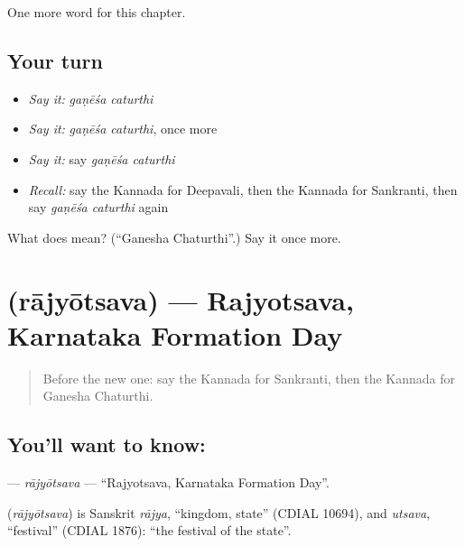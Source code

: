 \begin{grammarlens}[title={What you've built}]
One more word for this chapter.
\end{grammarlens}

\subsection*{Your turn}
\begin{itemize}
\raggedright
  \item \emph{Say it:} \emph{gaṇēśa caturthi}
  \item \emph{Say it:} \emph{gaṇēśa caturthi}, once more
  \item \emph{Say it:} say \emph{gaṇēśa caturthi}
  \item \emph{Recall:} say the Kannada for Deepavali, then the Kannada for Sankranti, then say \emph{gaṇēśa caturthi} again
\end{itemize}

\begin{tcolorbox}[breakable,colback=teal!4,colframe=teal!35!black,title={Before you move on}]
What does   mean? (\textquotedblleft{}Ganesha Chaturthi\textquotedblright{}.) Say it once more.
\end{tcolorbox}
\section[\texorpdfstring{\kn{ರಾಜ್ಯೋತ್ಸವ} (rājyōtsava)}{ರಾಜ್ಯೋತ್ಸವ (rājyōtsava)}]{ (rājyōtsava) — Rajyotsava, Karnataka Formation Day}

\label{lesson:KA-C247-rajyotsava}



\begin{quote}
Before the new one: say the Kannada for Sankranti, then the Kannada for Ganesha Chaturthi.
\end{quote}

\subsection*{You'll want to know: }
\textbf{} — \emph{rājyōtsava} — \textquotedblleft{}Rajyotsava, Karnataka Formation Day\textquotedblright{}.

\begin{cousinweb}
\textbf{} (\emph{rājyōtsava}) is Sanskrit \emph{rājya}, \textquotedblleft{}kingdom, state\textquotedblright{} (CDIAL 10694), and \emph{utsava}, \textquotedblleft{}festival\textquotedblright{} (CDIAL 1876): \textquotedblleft{}the festival of the state\textquotedblright{}.
\end{cousinweb}

